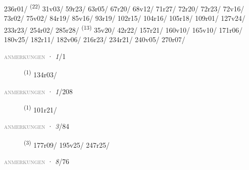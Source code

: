 \begin{description}
\mbox{236r01/} \textsuperscript{(22)} \mbox{31v03/} \mbox{59r23/} \mbox{63r05/} \mbox{67r20/} \mbox{68v12/} \mbox{71r27/} \mbox{72r20/} \mbox{72r23/} \mbox{72v16/} \mbox{73r02/} \mbox{75v02/} \mbox{84r19/} \mbox{85v16/} \mbox{93r19/} \mbox{102r15/} \mbox{104r16/} \mbox{105r18/} \mbox{109r01/} \mbox{127v24/} \mbox{233r23/} \mbox{254r02/} \mbox{285r28/} \textsuperscript{(13)} \mbox{35v20/} \mbox{42r22/} \mbox{157r21/} \mbox{160v10/} \mbox{165v10/} \mbox{171r06/} \mbox{180v25/} \mbox{182r11/} \mbox{182v06/} \mbox{216r23/} \mbox{234r21/} \mbox{240v05/} \mbox{270r07/}
\end{description}
\textsc{\textcolor{gray}{anmerkungen}}
\ENTRYEND
\noindent{} · \textit{1}/1 \LEMMALINE
\begin{description}
    \item[]  \textsuperscript{(1)} \mbox{134r03/}
\end{description}
\textsc{\textcolor{gray}{anmerkungen}}
\ENTRYEND
\noindent{} · \textit{1}/208 \LEMMALINE
\begin{description}
    \item[]  \textsuperscript{(1)} \mbox{101r21/}
\end{description}
\textsc{\textcolor{gray}{anmerkungen}}
\ENTRYEND
\noindent{} · \textit{3}/84 \LEMMALINE
\begin{description}
    \item[]  \textsuperscript{(3)} \mbox{177r09/} \mbox{195v25/} \mbox{247r25/}
\end{description}
\textsc{\textcolor{gray}{anmerkungen}}
\ENTRYEND
\noindent{} · \textit{8}/76 \LEMMALINE
